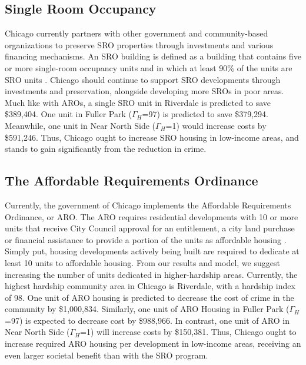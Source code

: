 \documentclass{article}
\begin{document}
\begin{onehalfspacing}
\subsection{Single Room Occupancy}
Chicago currently partners with other government and community-based organizations to preserve SRO properties through investments and various financing mechanisms. An SRO building is defined as a building that contains five or more single-room occupancy units and in which at least 90\% of the units are SRO units \cite{SRO}. Chicago should continue to support SRO developments through investments and preservation, alongside developing more SROs in poor areas. Much like with AROs, a single SRO unit in Riverdale is predicted to save \$389,404. One unit in Fuller Park ($\Gamma_H$=97) is predicted to save \$379,294. Meanwhile, one unit in Near North Side ($\Gamma_H$=1) would increase costs by \$591,246. Thus, Chicago ought to increase SRO housing in low-income areas, and stands to gain significantly from the reduction in crime.

\subsection{The Affordable Requirements Ordinance}
Currently, the government of Chicago implements the Affordable Requirements Ordinance, or ARO. The ARO requires residential developments with 10 or more units that receive City Council approval for an entitlement, a city land purchase or financial assistance to provide a portion of the units as affordable housing \cite{ARO}. Simply put, housing developments actively being built are required to dedicate at least 10 units to affordable housing. From our results and model, we suggest increasing the number of units dedicated in higher-hardship areas. Currently, the highest hardship community area in Chicago is Riverdale, with a hardship index of 98. One unit of ARO housing is predicted to decrease the cost of crime in the community by \$1,000,834. Similarly, one unit of ARO Housing in Fuller Park ($\Gamma_H$=97) is expected to decrease cost by \$988,966. In contrast, one unit of ARO in Near North Side ($\Gamma_H$=1) will increase costs by \$150,381. Thus, Chicago ought to increase required ARO housing per development in low-income areas, receiving an even larger societal benefit than with the SRO program.

\end{onehalfspacing}
\pagebreak
\printbibliography[heading=bibintoc, title=References]
\end{document}
